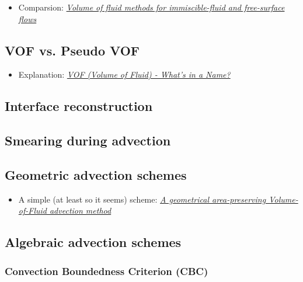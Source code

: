 \begin{itemize}
    \item Comparsion: \textit{\href{http://capfluidicslit.mme.pdx.edu/reference/Numerics/Gopala_ChemEngJ2008_VOFMethodsFreeSurfaceFlow.pdf}{Volume of fluid methods for immiscible-fluid and free-surface flows}}
\end{itemize}

\subsection{VOF vs. Pseudo VOF}

\begin{itemize}
    \item Explanation: \textit{\href{http://www.flow3d.com/cfd-101/cfd-101-VOF.html}{VOF (Volume of Fluid) - What's in a Name?}}
\end{itemize}

\subsection{Interface reconstruction}

\subsection{Smearing during advection}

\subsection{Geometric advection schemes}

\begin{itemize}
    \item A simple (at least so it seems) scheme: \textit{\href{http://www.lmm.jussieu.fr/~zaleski/nota02.pdf}{A geometrical area-preserving Volume-of-Fluid advection method}}
\end{itemize}

\subsection{Algebraic advection schemes}

\subsubsection{Convection Boundedness Criterion (CBC)}

